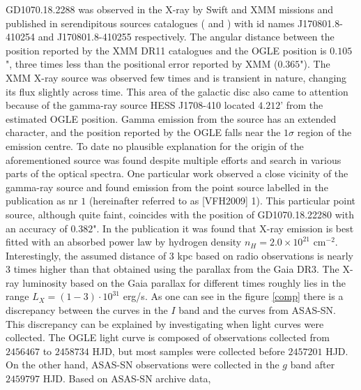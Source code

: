 \documentclass{pracalicmgr}
\begin{document}
GD1070.18.2288 was observed in the X-ray by Swift and XMM missions and published in serendipitous sources catalogues
(\citet{evans_2sxps_2020} and \citet{traulsen_xmm-newton_2020}) with id names J170801.8-410254 and J170801.8-410255
respectively. The angular distance between the position reported by the XMM DR11 catalogues \citep{traulsen_xmm-newton_2020} and the OGLE position is $0.105$",
three times less than the positional error reported by XMM ($0.365$").
The XMM X-ray source was observed few times and is transient in nature, changing its flux slightly across time.
This area of the galactic disc also came to attention because of the gamma-ray source HESS J1708-410 \citep{aharonian_hess_2008} located $4.212$' from the estimated OGLE position. 
Gamma emission from the source has an extended character, and the position reported by the OGLE falls near the $1\sigma$ region of the emission centre.
To date no plausible explanation for the origin
of the aforementioned source was found despite multiple efforts and search in various parts of the optical spectra.
One particular work \citep{van_etten_multi-wavelength_2009} observed a close vicinity of
the gamma-ray source and found emission from the point source labelled in the publication as nr $1$ (hereinafter referred to as [VFH2009] 1).
This particular point source, although quite faint, coincides with the position of GD1070.18.22280 with an accuracy of $0.382$". 
In the publication it was found that X-ray emission is best fitted with an absorbed power law by hydrogen density $n_H=2.0\times 10^{21}$ $\textrm{cm}^{-2}$.
Interestingly, the assumed distance of $3$ kpc based on radio observations is nearly $3$ times higher than that obtained using the parallax from the Gaia DR3.
The X-ray luminosity based on the Gaia parallax for different times roughly lies in the range $L_{X}=(1-3)\cdot10^{31}$ erg/s.\hfil \break%
\hspace*{17.62482 pt} As one can see in the figure \ref{comp} there is a discrepancy between the curves in the $I$ band and the curves from ASAS-SN.
This discrepancy can be explained by investigating when light curves were collected. The OGLE
light curve is composed of observations collected from $2456467$ to $2458734$ HJD, but most samples were collected before $2457201$ HJD.
On the other hand, ASAS-SN observations were collected in the $g$ band after $2459797$ HJD. Based on ASAS-SN archive data,
\end{document}
